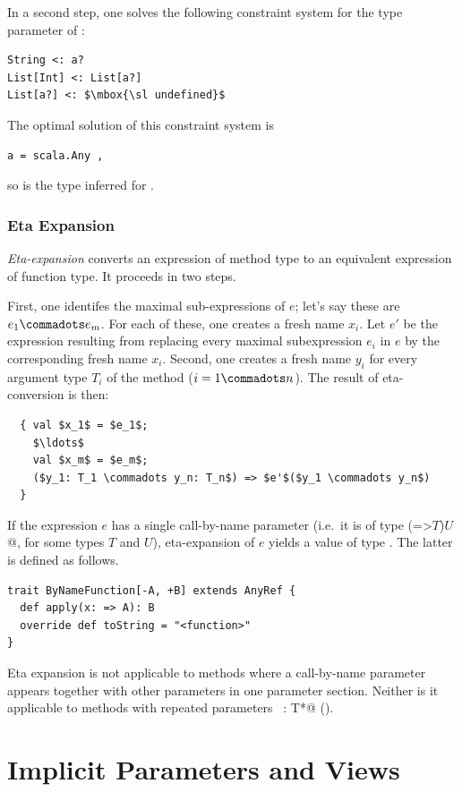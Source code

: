 In a second step, one solves the following constraint system for
the type parameter  of :
\begin{lstlisting}
String <: a?
List[Int] <: List[a?]
List[a?] <: $\mbox{\sl undefined}$
\end{lstlisting}
The optimal solution of this constraint system is
\begin{lstlisting}
a = scala.Any ,
\end{lstlisting}
so  is the type inferred for .

\subsection{Eta Expansion}\label{sec:eta-expand}

  {\em Eta-expansion} converts an expression of method type to an
  equivalent expression of function type. It proceeds in two steps.

  First, one identifes the maximal sub-expressions of $e$; let's
  say these are $e_1 \commadots e_m$. For each of these, one creates a
  fresh name $x_i$. Let $e'$ be the expression resulting from
  replacing every maximal subexpression $e_i$ in $e$ by the
  corresponding fresh name $x_i$. Second, one creates a fresh name $y_i$
  for every argument type $T_i$ of the method ($i = 1 \commadots
  n$). The result of eta-conversion is then:
\begin{lstlisting}
  { val $x_1$ = $e_1$; 
    $\ldots$ 
    val $x_m$ = $e_m$; 
    ($y_1: T_1 \commadots y_n: T_n$) => $e'$($y_1 \commadots y_n$) 
  }
\end{lstlisting}

If the expression $e$ has a single call-by-name parameter (i.e.\ it is
of type \lstinline@(=>$T$)$U$@, for some types $T$ and $U$),
eta-expansion of $e$ yields a value of type
\lstinline@ByNameFunction@. The latter is defined as follows.
\begin{lstlisting}
trait ByNameFunction[-A, +B] extends AnyRef {
  def apply(x: => A): B
  override def toString = "<function>"
}
\end{lstlisting}
Eta expansion is not applicable to methods where a call-by-name
parameter appears together with other parameters in one parameter
section. Neither is it applicable to methods with
repeated parameters ~\lstinline@x: T*@ (). 

\chapter{Implicit Parameters and Views}\label{sec:implicits}

